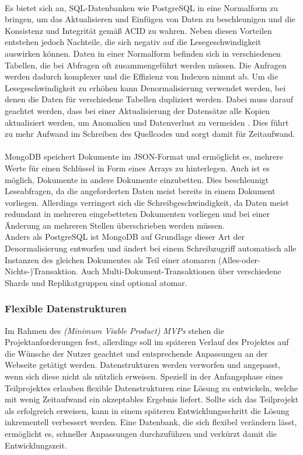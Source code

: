\paragraph{}
Es bietet sich an, SQL-Datenbanken wie PostgreSQL in eine Normalform zu bringen, um das Aktualisieren und Einfügen von Daten zu beschleunigen und die Konsistenz und Integrität gemäß ACID zu wahren.
Neben diesen Vorteilen entstehen jedoch Nachteile, die sich negativ auf die Lesegeschwindigkeit auswirken können.
Daten in einer Normalform befinden sich in verschiedenen Tabellen, die bei Abfragen oft zusammengeführt werden müssen.
Die Anfragen werden dadurch komplexer und die Effizienz von Indexen nimmt ab.
Um die Lesegeschwindigkeit zu erhöhen kann Denormalisierung verwendet werden, bei denen die Daten für verschiedene Tabellen dupliziert werden.
Dabei muss darauf geachtet werden, dass bei einer Aktualisierung der Datensätze alle Kopien aktualisiert werden, um Anomalien und Datenverlust zu vermeiden \cite{db:denormalization}.
Dies führt zu mehr Aufwand im Schreiben des Quellcodes und sorgt damit für Zeitaufwand.


\paragraph{}
MongoDB speichert Dokumente im JSON-Format und ermöglicht es, mehrere Werte für einen Schlüssel in Form eines Arrays zu hinterlegen.
Auch ist es möglich, Dokumente in andere Dokumente einzubetten. \cite{db:mongoEmbeddedDocuments}
Dies beschleunigt Leseabfragen, da die angeforderten Daten meist bereits in einem Dokument vorliegen.
Allerdings verringert sich die Schreibgeschwindigkeit, da Daten meist redundant in mehreren eingebetteten Dokumenten vorliegen und bei einer Änderung an mehreren Stellen überschrieben werden müssen.\\
Anders als PostgreSQL ist MongoDB auf Grundlage dieser Art der Denormalisierung entworfen und ändert bei einem Schreibzugriff automatisch alle Instanzen des gleichen Dokumentes als Teil einer atomaren (Alles-oder-Nichts-)Transaktion.
Auch Multi-Dokument-Transaktionen über verschiedene Shards und Replikatgruppen sind optional atomar. \cite{db:mongoAcidCompliance}

\subsubsection{Flexible Datenstrukturen}
Im Rahmen des \textit{(Minimum Viable Product) MVPs} stehen die Projektanforderungen fest, allerdings soll im späteren Verlauf des Projektes auf die Wünsche der Nutzer geachtet und entsprechende Anpassungen an der Webseite getätigt werden.
Datenstrukturen werden verworfen und angepasst, wenn sich diese nicht als nützlich erweisen.
Speziell in der Anfangsphase eines Teilprojektes erlauben flexible Datenstrukturen eine Lösung zu entwickeln, welche mit wenig Zeitaufwand ein akzeptables Ergebnis liefert.
Sollte sich das Teilprojekt als erfolgreich erweisen, kann in einem späteren Entwicklungsschritt die Lösung inkrementell verbessert werden.
Eine Datenbank, die sich flexibel verändern lässt, ermöglicht es, schneller Anpassungen durchzuführen und verkürzt damit die Entwicklungszeit.

